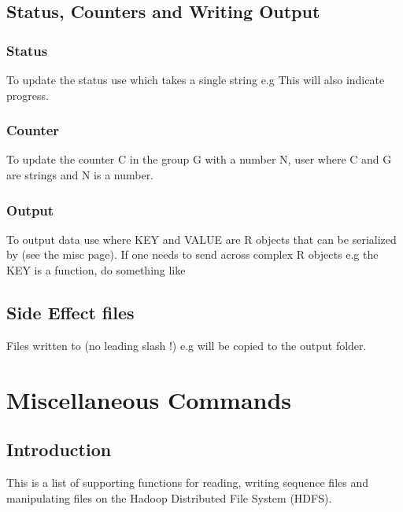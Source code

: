 \documentclass[letterpaper,10pt,english]{manual}
\begin{document}
\section{Status, Counters and Writing Output}


\subsection{Status}

To update the status use  which takes a single string e.g 
This will also indicate progress.


\subsection{Counter}

To update the counter C in the group G with a number N, user 
where C and G are strings and N is a number.


\subsection{Output}

To output data use  where KEY and VALUE are R objects that can be serialized by  (see the misc page). If one needs to send across complex R objects e.g the KEY is a function, do something like 


\section{Side Effect files}

Files written to  (no leading slash !) e.g  will be copied to the output folder.

\resetcurrentobjects
\hypertarget{--doc-rhmisc}{}

\chapter{Miscellaneous Commands}


\section{Introduction}

This is a list of supporting functions for reading, writing sequence files and
manipulating files on the Hadoop Distributed File System (HDFS).
\end{document}
